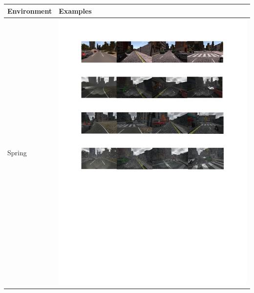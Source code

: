 \documentclass{svproc}
\begin{document}
\begin{table}[!ht]
		\centering
	
		\begin{tabular}{|C{2.5cm}|C{8.5cm}|}
			\hline
			\textbf{Environment} & \textbf{Examples} \\ \hline
			Spring & \begin{minipage}{.9\textwidth}\includegraphics[scale=.5,trim=2cm 24.5cm 2cm 2.5cm,clip]{examples.pdf}\end{minipage} \\ \hline

\end{tabular}
\end{table}
\end{document}
